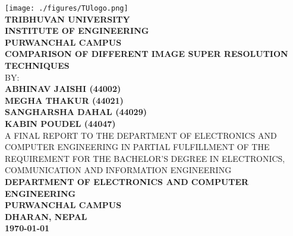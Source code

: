 \thispagestyle{empty} %



{
	\thispagestyle{empty}
	\centering
	\normalsize
	  
	\texttt{[image: ./figures/TUlogo.png]}\\[0.5cm]
	{\bf{TRIBHUVAN UNIVERSITY}\\
	{INSTITUTE OF ENGINEERING}\\
	PURWANCHAL CAMPUS}
	\\[1cm]
	
	{\bf COMPARISON OF DIFFERENT IMAGE SUPER RESOLUTION TECHNIQUES}\\[1cm]
	
	BY:\\
	{\bf ABHINAV JAISHI \hspace{1in} (44002)}\\
	{\bf MEGHA THAKUR    \hspace{1in} (44021)}\\
	{\bf SANGHARSHA DAHAL \hspace{0.6in} (44029)}\\
	{\bf KABIN POUDEL     \hspace{1in}\space\space\space\space (44047)}\\[1.5cm]

	



	A FINAL REPORT TO THE DEPARTMENT OF ELECTRONICS AND COMPUTER
	ENGINEERING IN PARTIAL FULFILLMENT OF THE REQUIREMENT FOR THE BACHELOR'S
	DEGREE IN ELECTRONICS, COMMUNICATION AND INFORMATION ENGINEERING\\[0.5cm]
	
	{\bf DEPARTMENT OF ELECTRONICS AND COMPUTER ENGINEERING\\
	PURWANCHAL CAMPUS\\
	DHARAN, NEPAL}\\[1.5cm]

	{\bf\today}
	
	
}

